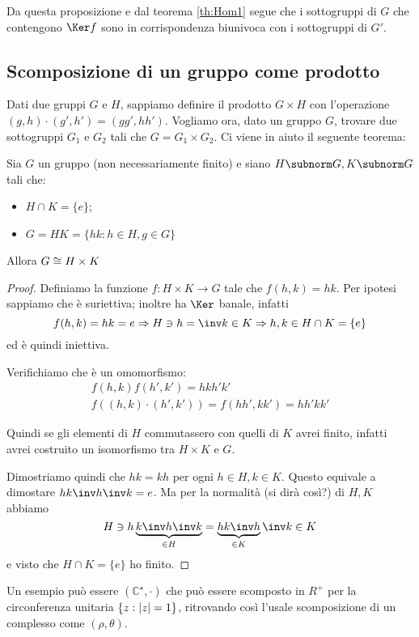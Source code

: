 \documentclass[a4paper,10pt,oneside]{math_article}
\begin{document}
      Da questa proposizione e dal teorema \ref{th:Hom1} segue che i sottogruppi di $G$ che contengono $\Ker f$ sono in corrispondenza biunivoca con i sottogruppi di $G'$.
      
      \subsection{Scomposizione di un gruppo come prodotto}

      Dati due gruppi $G$ e $H$, sappiamo definire il prodotto $G \times H$ con l'operazione $(g,h)\cdot (g',h')=(gg',hh')$. Vogliamo ora, dato un gruppo $G$, trovare due sottogruppi $G_1$ e $G_2$ tali che $G=G_1\times G_2$. Ci viene in aiuto il seguente teorema:
      
      \begin{mytheorem}
	Sia $G$ un gruppo (non necessariamente finito) e siano $H\subnorm G, K \subnorm G$ tali che:
	\begin{itemize}
	 \item $H\cap K=\{e\}$;
	 \item $G = HK = \{hk: h\in H, g \in G\}$
	\end{itemize}
	Allora $G \cong H\times K$
      \end{mytheorem}
      \begin{proof}
	Definiamo la funzione $f: H\times K \rightarrow G$ tale che $f(h,k)=hk$. Per ipotesi sappiamo che è suriettiva; inoltre ha $\Ker$ banale, infatti 
	\[f(h,k)=hk=e \Rightarrow H \ni h = \inv k \in K \Rightarrow h,k \in H \cap K = \{e\} \]
	ed è quindi iniettiva.
	
	Verifichiamo che è un omomorfismo: 
	\begin{gather*}
	  f(h,k)f(h',k')=hkh'k' \\
	  f\left((h,k)\cdot(h',k')\right)=f(hh',kk')=hh'kk'
	\end{gather*}
      
	Quindi se gli elementi di $H$ commutassero con quelli di $K$ avrei finito, infatti avrei costruito un isomorfismo tra $H\times K$ e $G$.
	
	Dimostriamo quindi che $hk=kh$ per ogni $ h\in H, k \in K$. Questo equivale a dimostare $hk\inv h\inv k=e$. Ma per la normalità (si dirà così?) di $H,K$ abbiamo
	\[
	H \ni h\underbrace{k\inv h \inv k}_{\in H} = \underbrace{hk\inv h}_{\in K}\inv k \in K
	\]
	e visto che $H\cap K=\{e\}$ ho finito.
      \end{proof}
      
      Un esempio può essere $(\mathbb C^\star, \cdot)$ che può essere scomposto in $R^+$ per la circonferenza unitaria $\{z:\left|z\right|=1\}$, ritrovando così l'usale scomposizione di un complesso come $(\rho,\theta)$.
      
\end{document}
